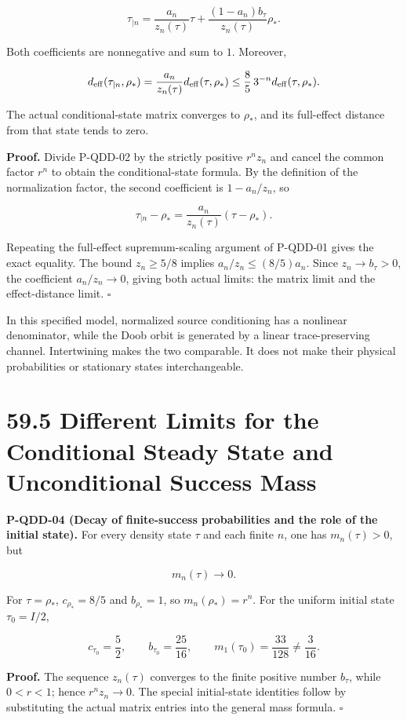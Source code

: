 \documentclass[
  11pt,
  oneside]{book}
\begin{document}
\[
\tau_{\mid n}
=\frac{a_n}{z_n(\tau)}\tau
+\frac{(1-a_n)b_\tau}{z_n(\tau)}\rho_*.
\]

Both coefficients are nonnegative and sum to \(1\). Moreover,

\[
d_{\rm eff}(\tau_{\mid n},\rho_*)
=\frac{a_n}{z_n(\tau)}d_{\rm eff}(\tau,\rho_*)
\le\frac85\,3^{-n}d_{\rm eff}(\tau,\rho_*).
\]

The actual conditional-state matrix converges to \(\rho_*\), and its
full-effect distance from that state tends to zero.

\textbf{Proof.} Divide P-QDD-02 by the strictly positive \(r^nz_n\) and
cancel the common factor \(r^n\) to obtain the conditional-state
formula. By the definition of the normalization factor, the second
coefficient is \(1-a_n/z_n\), so

\[
\tau_{\mid n}-\rho_*
=\frac{a_n}{z_n(\tau)}(\tau-\rho_*).
\]

Repeating the full-effect supremum-scaling argument of P-QDD-01 gives
the exact equality. The bound \(z_n\ge5/8\) implies
\(a_n/z_n\le(8/5)a_n\). Since \(z_n\to b_\tau>0\), the coefficient
\(a_n/z_n\to0\), giving both actual limits: the matrix limit and the
effect-distance limit. \(\square\)

In this specified model, normalized source conditioning has a nonlinear
denominator, while the Doob orbit is generated by a linear
trace-preserving channel. Intertwining makes the two comparable. It does
not make their physical probabilities or stationary states
interchangeable.

\section{59.5 Different Limits for the Conditional Steady State and
Unconditional Success Mass}

\label{p-qdd-04}{}

\textbf{P-QDD-04 (Decay of finite-success probabilities and the role of
the initial state).} For every density state \(\tau\) and each finite
\(n\), one has \(m_n(\tau)>0\), but

\[
m_n(\tau)\longrightarrow0.
\]

For \(\tau=\rho_*\), \(c_{\rho_*}=8/5\) and \(b_{\rho_*}=1\), so
\(m_n(\rho_*)=r^n\). For the uniform initial state \(\tau_0=I/2\),

\[
c_{\tau_0}=\frac52,\qquad b_{\tau_0}=\frac{25}{16},\qquad
m_1(\tau_0)=\frac{33}{128}\ne\frac3{16}.
\]

\textbf{Proof.} The sequence \(z_n(\tau)\) converges to the finite
positive number \(b_\tau\), while \(0<r<1\); hence \(r^nz_n\to0\). The
special initial-state identities follow by substituting the actual
matrix entries into the general mass formula. \(\square\)
\end{document}
